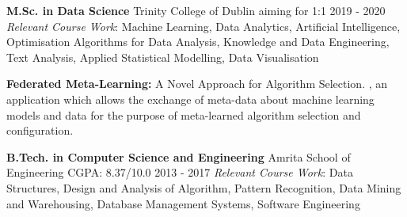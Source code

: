 \vspace{0.5ex}
\begin{cventries}
  \cventry
    {\textbf{M.Sc. in Data Science}}
    {Trinity College of Dublin}
    {aiming for 1:1}
    {2019 - 2020}
    {\textit{Relevant Course Work}: Machine Learning, Data Analytics, Artificial Intelligence, Optimisation Algorithms for Data Analysis, Knowledge and Data Engineering, Text Analysis, Applied Statistical Modelling, Data Visualisation}
    
    \begin{cvskills}
        {\textbf{Federated Meta-Learning:} A Novel Approach for Algorithm Selection.}
        \cvskill{}
        {, an application which allows the exchange of meta-data about machine learning models and data for the purpose of meta-learned algorithm selection and configuration.}
    \end{cvskills}
  
  \cventry
    {\textbf{B.Tech. in Computer Science and Engineering}}
    {Amrita School of Engineering}
    {CGPA: 8.37/10.0}
    {2013 - 2017}
    {\textit{Relevant Course Work}: Data Structures, Design and Analysis of Algorithm, Pattern Recognition, Data Mining and Warehousing, Database Management Systems, Software Engineering}
\end{cventries}
